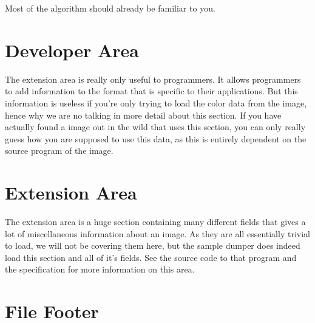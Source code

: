 \begin{refsection}
\begin{algorithm}[H]
\begin{algorithmic}[1]
              \EndIf

              \process


            \EndRepeatn

          \EndIf
        \Else


          \EndIf

          \process


        \EndIf
      \EndWhile
    \end{algorithmic}
  \end{algorithm}

  Most of the algorithm should already be familiar to you.

  \section{Developer Area}

  The extension area is really only useful to programmers. It allows
  programmers to add information to the \tga format that is specific
  to their applications. But this information is useless if you're
  only trying to load the color data from the \tga image, hence why we
  are no talking in more detail about this section. If you have
  actually found a \tga image out in the wild that uses this
  section, you can only really guess how you are supposed to use this
  data, as this is entirely dependent on the source program of the image.

  \section{Extension Area}

  The extension area is a huge section containing many different
  fields that gives a lot of miscellaneous information about an
  image. As they are all essentially trivial to load, we will not be
  covering them here, but the sample \tga dumper does indeed load this
  section and all of it's fields. See the source code to that program and
  the \tga specification for more information on this area.

  \section{File Footer}


\end{refsection}
